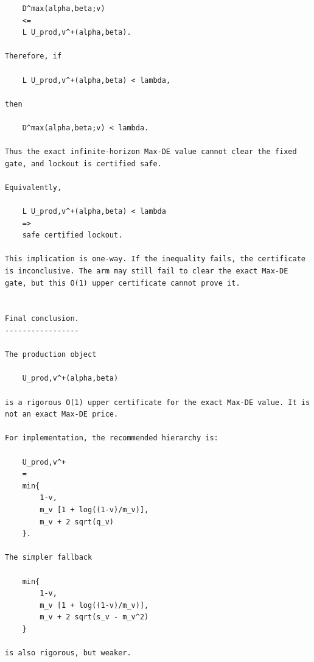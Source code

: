 \begin{small}
\begin{verbatim}
    D^max(alpha,beta;v)
    <=
    L U_prod,v^+(alpha,beta).

Therefore, if

    L U_prod,v^+(alpha,beta) < lambda,

then

    D^max(alpha,beta;v) < lambda.

Thus the exact infinite-horizon Max-DE value cannot clear the fixed gate, and lockout is certified safe.

Equivalently,

    L U_prod,v^+(alpha,beta) < lambda
    =>
    safe certified lockout.

This implication is one-way. If the inequality fails, the certificate is inconclusive. The arm may still fail to clear the exact Max-DE gate, but this O(1) upper certificate cannot prove it.


Final conclusion.
-----------------

The production object

    U_prod,v^+(alpha,beta)

is a rigorous O(1) upper certificate for the exact Max-DE value. It is not an exact Max-DE price.

For implementation, the recommended hierarchy is:

    U_prod,v^+
    =
    min{
        1-v,
        m_v [1 + log((1-v)/m_v)],
        m_v + 2 sqrt(q_v)
    }.

The simpler fallback

    min{
        1-v,
        m_v [1 + log((1-v)/m_v)],
        m_v + 2 sqrt(s_v - m_v^2)
    }

is also rigorous, but weaker.
\end{verbatim}
\end{small}
